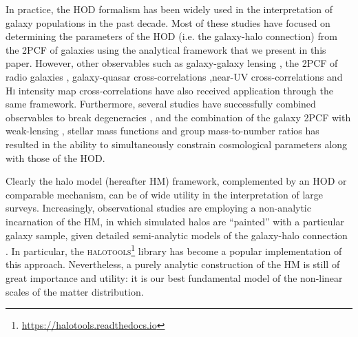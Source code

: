 \documentclass[5p]{elsarticle}
\newcommand{\bd}[1]{\textcolor{purple}{\textbf{[BD: #1]}}}
\begin{document}
In practice, the HOD formalism has been widely used in the interpretation of galaxy populations in the past decade. Most of these studies have focused on determining the parameters of the HOD (i.e. the galaxy-halo connection) from the 2PCF of galaxies \citep[eg.][]{Moustakas2002,Bullock2002,Zheng2004,Zehavi2005,Blake2008,Zehavi2011,Beutler2013,Skibba2015} using the analytical framework that we present in this paper. However, other observables such as galaxy-galaxy lensing \citep{Mandelbaum2006}, the 2PCF of radio galaxies \citep{Wake2008a,Kim2011}, galaxy-quasar cross-correlations \citep{Shen2013},near-UV cross-correlations \citep{Krause2012} and \textsc{Hi} intensity map cross-correlations \citep{Padmanabhan2016b,Wolz2019} have also received application through the same framework. Furthermore, several studies have successfully combined observables to break degeneracies \citep{Leauthaud2011,Leauthaud2012,More2013}, and the combination of the galaxy 2PCF with weak-lensing \citep{More2015}, stellar mass functions \citep{Coupon2015} and group mass-to-number ratios \citep{Reddick2014} has resulted in the ability to simultaneously constrain cosmological parameters along with those of the HOD.

Clearly the halo model (hereafter HM) framework, complemented by an HOD or comparable mechanism, can be of wide utility in the interpretation of large surveys.
Increasingly, observational studies are employing a non-analytic incarnation of the HM, in which simulated halos are ``painted'' with a particular galaxy sample, given detailed semi-analytic models of the galaxy-halo connection \citep{XXX}.
In particular, the \textsc{halotools}\footnote{\url{https://halotools.readthedocs.io}} library has become a popular implementation of this approach.
Nevertheless, a purely analytic construction of the HM is still of great importance and utility: it is our best fundamental model of the non-linear scales of the matter distribution.
\end{document}
